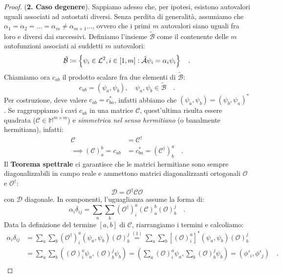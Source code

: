 \begin{proof}
    (\textbf{2. Caso degenere}). Sappiamo adesso che, per ipotesi, esistono autovalori uguali associati ad autostati diversi. Senza perdita di generalità, assumiamo che $\alpha_1 = \alpha_2 = \dots = \alpha_m \neq \alpha_{m+1} \dots$, ovvero che i primi $m$ autovalori siano uguali fra loro e diversi dai successivi. Definiamo l'insieme $\tilde{\mathcal{B}}$ come il contenente delle $m$ autofunzioni associati ai suddetti $m$ autovalori:
    \[
        \tilde{\mathcal{B}} \coloneq \left\{ \psi_i \in \mathcal{L}^2, i \in [1, m] : \hat{\mathcal{A}}\psi_i = \alpha_i\psi_i \right\} \quad.
    \]
    Chiamiamo ora $c_{ab}$ il prodotto scalare fra due elementi di $\tilde{\mathcal{B}}$:
    \[
    c_{ab} = (\psi_a, \psi_b), \quad \psi_a, \psi_b \in \tilde{\mathcal{B}} \quad.
    \]
    Per costruzione, deve valere $c_{ab} = c_{ba}^*$, infatti abbiamo che $(\psi_a, \psi_b) = (\psi_b, \psi_a)^*$. Se raggruppiamo i cavi $c_{ab}$ in una matrice $\mathcal{C}$, quest'ultima risulta essere quadrata ($\mathcal{C} \in \mathbb{M}^{m\times m}$) e \emph{simmetrica nel senso hermitiano} (o banalmente hermitiana), infatti:
    \[
    \begin{aligned}
        \mathcal{C} &= \mathcal{C}^\dagger \\
        \implies ({\mathcal{C}})_a^b = c_{ab} &= c_{ba}^* = ({\mathcal{C}^\dagger})_b^a \quad.
    \end{aligned}
    \]  
    Il \textbf{Teorema spettrale} ci garantisce che le matrici hermitiane sono sempre diagonalizzabili in campo reale e ammettono matrici diagonalizzanti ortogonali $\mathcal{O}$ e $\mathcal{O}^{\dagger}$: 
    \[
        \mathcal{D} = \mathcal{O}^\dagger \mathcal{C} \mathcal{O} 
    \]
    con $\mathcal{D}$ diagonale. In componenti, l'uguaglianza assume la forma di:
    \[
        \alpha_i \delta_{ij} = \sum_a \sum_b (\mathcal{O}^\dagger)_i^a (\mathcal{C})_a^b (\mathcal{O})_b^j \quad.
    \]
    Data la definizione del termine $[a,b]$ di $\mathcal{C}$, riarrangiamo i termini e calcoliamo:
    \[
        \begin{aligned}
            \alpha_i \delta_{ij} &= \sum_a \sum_b (\mathcal{O}^\dagger)_i^a (\psi_a,\psi_b) (\mathcal{O})_b^j \overset{(1)}{=} \sum_a \sum_b [(\mathcal{O})_i^a]^* (\psi_a,\psi_b) (\mathcal{O})_b^j \\
            &= \sum_a \sum_b ((\mathcal{O})_i^a\psi_a,(\mathcal{O})_b^j\psi_b) = \left( \sum_a(\mathcal{O})_i^a\psi_a, \sum_b (\mathcal{O})_b^j\psi_b \right) = (\phi'_i, \phi'_j) \quad. \\

\end{aligned}\]
\end{proof}
